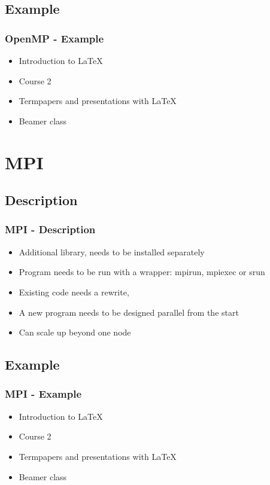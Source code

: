 \documentclass[hyperref={pdfpagelabels=false}]{beamer}
\begin{document}
    \subsection{Example}
    \begin{frame}
        \frametitle{OpenMP - Example}
        \begin{itemize}
            \item Introduction to  \LaTeX{}  
            \item Course 2 
            \item Termpapers and presentations with \LaTeX{}  
            \item Beamer class
        \end{itemize} 
    \end{frame}

    \section{MPI} 
    \subsection{Description}
    \begin{frame}
        \frametitle{MPI - Description}
        \begin{itemize}
            \item Additional library, needs to be installed separately  
            \item Program needs to be run with a wrapper: mpirun, mpiexec or srun
            \item Existing code needs a rewrite,
            \item A new program needs to be designed parallel from the start 
            \item Can scale up beyond one node
        \end{itemize} 
    \end{frame}

    \subsection{Example}
    \begin{frame}
        \frametitle{MPI - Example}
        \begin{itemize}
            \item Introduction to  \LaTeX{}  
            \item Course 2 
            \item Termpapers and presentations with \LaTeX{}  
            \item Beamer class
        \end{itemize} 
    \end{frame}
\end{document}
